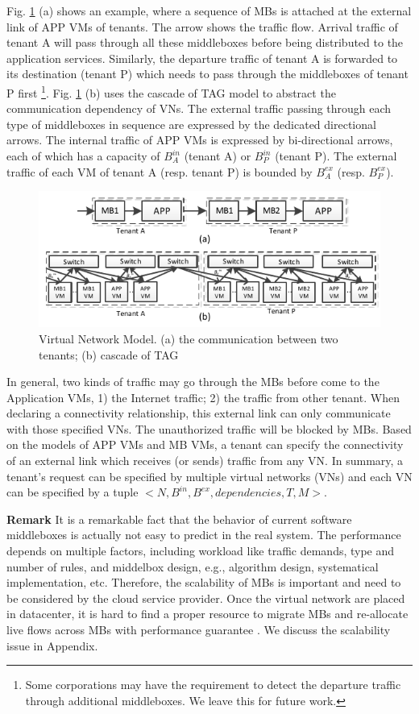 \documentclass[10pt, conference, letterpaper]{IEEEtran}
\begin{document}
Fig. \ref{fig:abstraction} (a) shows an example, where a sequence of MBs is attached at the external link of APP VMs of tenants. The arrow shows the traffic flow. Arrival traffic of tenant A will pass through all these middleboxes before being distributed to the application services. Similarly,  the departure traffic of tenant A is forwarded to its destination (tenant P) which needs to pass through the middleboxes of tenant P first \footnote{Some corporations may have the requirement to detect the departure traffic through additional middleboxes. We leave this for future work. }.  Fig. \ref{fig:abstraction} (b) uses the cascade of TAG model to abstract the communication dependency of VNs. The external traffic passing through each type of middleboxes in sequence are expressed by the dedicated directional arrows. The internal traffic of APP VMs is expressed by bi-directional arrows, each of which has a capacity of $B_{A}^{in}$ (tenant A) or $B_{P}^{in}$ (tenant P). The external traffic of each VM of tenant A (resp. tenant P) is bounded by $B_{A}^{ex}$ (resp. $B_{P}^{ex}$). 
\begin{figure}
	\centering
		\includegraphics[width=3.5 in]{fig/abstraction.pdf}
	\caption{Virtual Network Model. (a) the communication between two tenants; (b) cascade of TAG}
	\label{fig:abstraction}
\end{figure}

In general, two kinds of traffic may go through the MBs before come to the Application VMs, 1) the Internet traffic; 2) the traffic from other tenant. When declaring a connectivity relationship, this external link can only communicate with those specified VNs. The unauthorized traffic will be blocked by MBs. Based on the models of APP VMs and MB VMs, a tenant can specify the connectivity of an external link which receives (or sends) traffic from any VN. In summary, a tenant's request can be specified by multiple virtual networks (VNs) and each VN can be specified by a tuple $<N, B^{in}, B^{ex}, dependencies, T, M>$. 

\noindent \textbf{Remark } 
It is a remarkable fact that the behavior of current software middleboxes is actually not easy to predict in the real system. The performance depends on multiple factors, including workload like traffic demands, type and number of rules, and middelbox design, e.g., algorithm design, systematical implementation, etc. Therefore, the scalability of MBs is important and need to be considered by the cloud service provider. Once the virtual network are placed in datacenter, it is hard to find a proper resource to migrate MBs and re-allocate live flows across MBs with performance guarantee \cite{G13dio}. We discuss the scalability issue in Appendix.
\end{document}
